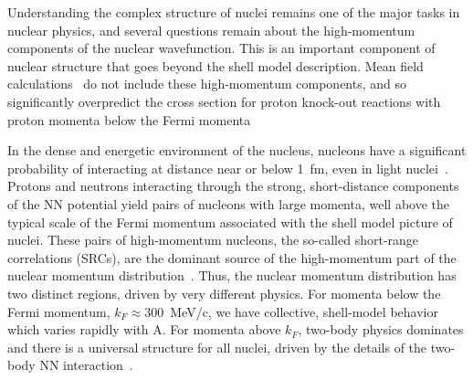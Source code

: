 

Understanding the complex structure of nuclei remains one of the major tasks in nuclear physics, and several questions remain about the
high-momentum components of the nuclear wavefunction. This is an important component of nuclear structure that goes beyond the shell model
description. Mean field calculations~\cite{DeForest1983} do not include these high-momentum components, and so significantly overpredict the cross
section for proton knock-out reactions with proton momenta below the Fermi momenta~\cite{VanDerSteenhoven1988547, Lapikas1993297, Kelly:1996hd}


In the dense and energetic environment of the nucleus, nucleons have a significant probability of interacting at distance near or below 1~fm, even
in light nuclei~\cite{carlson14,lu13}. Protons and neutrons interacting through the strong, short-distance components of the NN potential yield
pairs of nucleons with large momenta, well above the typical scale of the Fermi momentum associated with the shell model picture of nuclei. These
pairs of high-momentum nucleons, the so-called short-range correlations (SRCs), are the dominant source of the high-momentum part of the nuclear
momentum distribution~\cite{SLAC_Measurement_PRC.48.2451, src_john}. Thus, the nuclear momentum distribution has two distinct regions, driven by
very different physics. For momenta below the Fermi momentum, $k_F \approx 300$~MeV/c, we have collective, shell-model behavior which varies
rapidly with A. For momenta above $k_F$, two-body physics dominates and there is a universal structure for all nuclei, driven by the details
of the two-body NN interaction~\cite{RevModPhys.80.189, PhysRevC.53.1689, wiringa14}.


